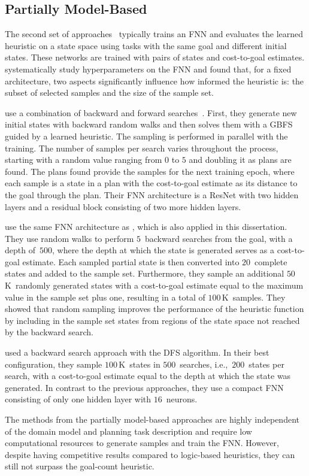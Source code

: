 \subsection{Partially Model-Based}
\label{sec:related-work-partially}

The second set of approaches~\cite{Ferber.etal/2020a, Yu.etal/2020, Ferber.etal/2022, OToole/2022} typically trains an FNN and evaluates the learned heuristic on a state space using tasks with the same goal and different initial states. These networks are trained with pairs of states and cost-to-goal estimates. \citet{Ferber.etal/2020a} systematically study hyperparameters on the FNN and found that, for a fixed architecture, two aspects significantly influence how informed the heuristic is: the subset of selected samples and the size of the sample set.

\citet{Ferber.etal/2022} use a combination of backward and forward searches~\cite{Arfaee.etal/2011}. First, they generate new initial states with backward random walks and then solves them with a GBFS guided by a learned heuristic. The sampling is performed in parallel with the training. The number of samples per search varies throughout the process, starting with a random value ranging from $0$ to $5$ and doubling it as plans are found. The plans found provide the samples for the next training epoch, where each sample is a state in a plan with the cost-to-goal estimate as its distance to the goal through the plan. Their FNN architecture is a ResNet with two hidden layers and a residual block consisting of two more hidden layers.

\citet{OToole/2022} use the same FNN architecture as \citet{Ferber.etal/2022}, which is also applied in this dissertation. They use random walks to perform $5$~backward searches from the goal, with a depth of~$500$, where the depth at which the state is generated serves as a cost-to-goal estimate. Each sampled partial state is then converted into $20$~complete states and added to the sample set. Furthermore, they sample an additional $50$\,K~randomly generated states with a cost-to-goal estimate equal to the maximum value in the sample set plus one, resulting in a total of $100$\,K~samples. They showed that random sampling improves the performance of the heuristic function by including in the sample set states from regions of the state space not reached by the backward search.

\citet{Yu.etal/2020} used a backward search approach with the DFS algorithm. In their best configuration, they sample $100$\,K~states in $500$~searches, i.e.,~$200$~states per search, with a cost-to-goal estimate equal to the depth at which the state was generated. In contrast to the previous approaches, they use a compact FNN consisting of only one hidden layer with $16$~neurons.

The methods from the partially model-based approaches are highly independent of the domain model and planning task description and require low computational resources to generate samples and train the FNN. However, despite having competitive results compared to logic-based heuristics, they can still not surpass the goal-count heuristic.
